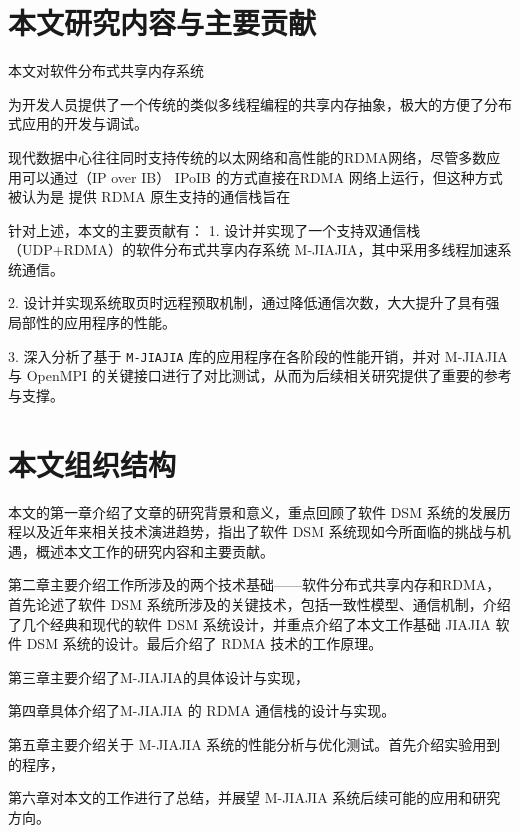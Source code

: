 {\section{本文研究内容与主要贡献}
本文对软件分布式共享内存系统


为开发人员提供了一个传统的类似多线程编程的共享内存抽象，极大的方便了分布式应用的开发与调试。

现代数据中心往往同时支持传统的以太网络和高性能的RDMA网络，尽管多数应用可以通过（IP over IB） IPoIB 的方式直接在RDMA 网络上运行，但这种方式被认为是
提供 RDMA 原生支持的通信栈旨在

针对上述，本文的主要贡献有：
1. 设计并实现了一个支持双通信栈（UDP+RDMA）的软件分布式共享内存系统 M-JIAJIA，其中采用多线程加速系统通信。

2. 设计并实现系统取页时远程预取机制，通过降低通信次数，大大提升了具有强局部性的应用程序的性能。

3. 深入分析了基于 \texttt{M-JIAJIA} 库的应用程序在各阶段的性能开销，并对 M-JIAJIA 与 OpenMPI 的关键接口进行了对比测试，从而为后续相关研究提供了重要的参考与支撑。

\section{本文组织结构}
本文的第一章介绍了文章的研究背景和意义，重点回顾了软件 DSM 系统的发展历程以及近年来相关技术演进趋势，指出了软件 DSM 系统现如今所面临的挑战与机遇，概述本文工作的研究内容和主要贡献。

第二章主要介绍工作所涉及的两个技术基础——软件分布式共享内存和RDMA，首先论述了软件 DSM 系统所涉及的关键技术，包括一致性模型、通信机制，介绍了几个经典和现代的软件 DSM 系统设计，并重点介绍了本文工作基础 JIAJIA 软件 DSM 系统的设计。最后介绍了 RDMA 技术的工作原理。

第三章主要介绍了M-JIAJIA的具体设计与实现，

第四章具体介绍了M-JIAJIA 的 RDMA 通信栈的设计与实现。

第五章主要介绍关于 M-JIAJIA 系统的性能分析与优化测试。首先介绍实验用到的程序，

第六章对本文的工作进行了总结，并展望 M-JIAJIA 系统后续可能的应用和研究方向。
}

